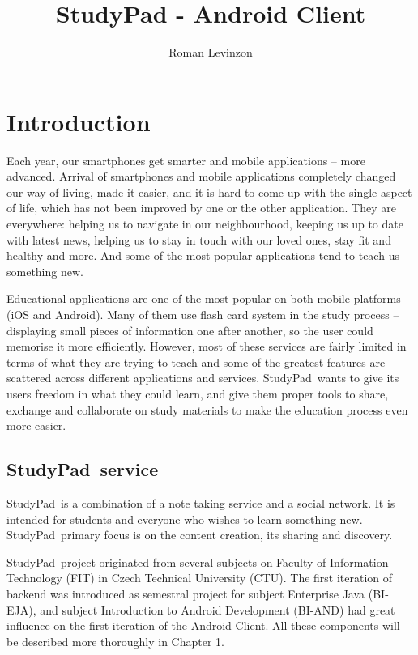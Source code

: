 \documentclass[thesis=B,english]{FITthesis}[2012/10/20]
\title{StudyPad - Android Client}
\author{Roman Levinzon} %
\newcommand{\appname}{StudyPad}
\begin{document}

\chapter{Introduction}

Each year, our smartphones get smarter and mobile applications -- more advanced. Arrival of smartphones and mobile applications completely changed our way of living, made it easier, and it is hard to come up with the single aspect of life, which has not been improved by one or the other application. They are everywhere: helping us to navigate in our neighbourhood, keeping us up to date with latest news, helping us to stay in touch with our loved ones, stay fit and healthy and more. And some of the most popular applications tend to teach us something new.

Educational applications are one of the most popular on both mobile platforms (iOS and Android). Many of them use flash card system in the study process -- displaying small pieces of information one after another, so the user could memorise it more efficiently. However, most of these services are fairly limited in terms of what they are trying to teach and some of the greatest  features are scattered across different applications and services. \appname\ wants to give its users freedom in what they could learn, and give them proper tools to share, exchange and collaborate on study materials to make the education process even more easier.

\section{\appname\ service}
\appname\ is a combination of a note taking service and a social network. It is intended for students and everyone who wishes to learn something new. \appname\ primary focus is on the content creation, its sharing and discovery. 

\appname\ project originated from several subjects on Faculty of Information Technology (FIT) in Czech Technical University (CTU). The first iteration of backend was introduced as semestral project for subject Enterprise Java (BI-EJA), and subject Introduction to Android Development (BI-AND) had great influence on the first iteration of the Android Client. All these components will be described more thoroughly in Chapter 1.
 
\end{document}
